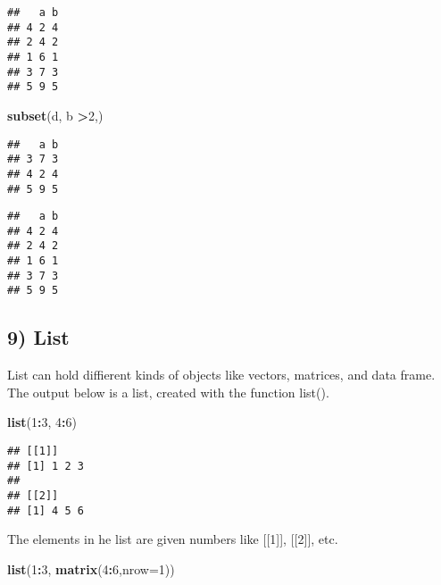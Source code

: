 \documentclass[
]{article}
\newenvironment{Shaded}{\begin{snugshade}}{\end{snugshade}}
\newcommand{\CommentTok}[1]{\textcolor[rgb]{0.56,0.35,0.01}{\textit{#1}}}
\newcommand{\DataTypeTok}[1]{\textcolor[rgb]{0.13,0.29,0.53}{#1}}
\newcommand{\DecValTok}[1]{\textcolor[rgb]{0.00,0.00,0.81}{#1}}
\newcommand{\KeywordTok}[1]{\textcolor[rgb]{0.13,0.29,0.53}{\textbf{#1}}}
\newcommand{\NormalTok}[1]{#1}
\newcommand{\OperatorTok}[1]{\textcolor[rgb]{0.81,0.36,0.00}{\textbf{#1}}}
\begin{document}
\begin{verbatim}
##   a b
## 4 2 4
## 2 4 2
## 1 6 1
## 3 7 3
## 5 9 5
\end{verbatim}

\begin{Shaded}
\begin{Highlighting}[]
\KeywordTok{subset}\NormalTok{(d, b }\OperatorTok{>}\DecValTok{2}\NormalTok{,)}
\end{Highlighting}
\end{Shaded}

\begin{verbatim}
##   a b
## 3 7 3
## 4 2 4
## 5 9 5
\end{verbatim}

\begin{Shaded}
\end{Shaded}

\begin{verbatim}
##   a b
## 4 2 4
## 2 4 2
## 1 6 1
## 3 7 3
## 5 9 5
\end{verbatim}

\hypertarget{list}{%
\subsection{9) List}\label{list}}

List can hold diffierent kinds of objects like vectors, matrices, and
data frame. The output below is a list, created with the function
list().

\begin{Shaded}
\begin{Highlighting}[]
\KeywordTok{list}\NormalTok{(}\DecValTok{1}\OperatorTok{:}\DecValTok{3}\NormalTok{, }\DecValTok{4}\OperatorTok{:}\DecValTok{6}\NormalTok{)}
\end{Highlighting}
\end{Shaded}

\begin{verbatim}
## [[1]]
## [1] 1 2 3
## 
## [[2]]
## [1] 4 5 6
\end{verbatim}

The elements in he list are given numbers like {[}{[}1{]}{]},
{[}{[}2{]}{]}, etc.

\begin{Shaded}
\begin{Highlighting}[]
\KeywordTok{list}\NormalTok{(}\DecValTok{1}\OperatorTok{:}\DecValTok{3}\NormalTok{, }\KeywordTok{matrix}\NormalTok{(}\DecValTok{4}\OperatorTok{:}\DecValTok{6}\NormalTok{,}\DataTypeTok{nrow=}\DecValTok{1}\NormalTok{))}
\end{Highlighting}
\end{Shaded}
\end{document}
